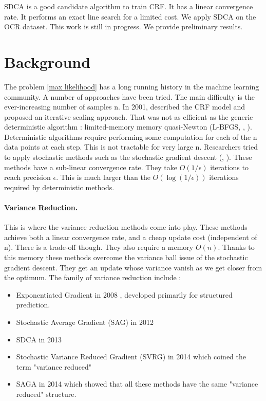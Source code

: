 \documentclass{article}
\DeclareMathOperator{\1}{\mathbb{1}}
\begin{document}
SDCA is a good candidate algorithm to train CRF.
It has a linear convergence rate.
It performs an exact line search for a limited cost.
We apply SDCA on the OCR dataset.
This work is still in progress.
We provide preliminary results.

\tableofcontents

\section{Background}
The problem \ref{max likelihood} has a long running history in the machine learning community.
A number of approaches have been tried.
The main difficulty is the ever-increasing number of samples n.
In 2001, \cite{lafferty_conditional_2001} described the CRF model and proposed an iterative scaling approach.
That was not as efficient as the generic deterministic algorithm : limited-memory memory quasi-Newton (L-BFGS, \cite{wallach_efficient_2002}, \cite{sha_shallow_2003}).
Deterministic algorithms require performing some computation for each of the n data points at each step.
This is not tractable for very large n.
Researchers tried to apply stochastic methods such as the stochastic gradient descent (\cite{vishwanathan_accelerated_2006}, \cite{finkel_efficient_2008}).
These methods have a sub-linear convergence rate.
They take $O(1/\epsilon)$ iterations to reach precision $\epsilon$.
This is much larger than the $O(\log(1/\epsilon))$ iterations required by deterministic methods.

\paragraph{Variance Reduction.}
This is where the variance reduction methods come into play.
These methods achieve both a linear convergence rate, and a cheap update cost (independent of n).
There is a trade-off though.
They also require a memory  $O(n)$.
Thanks to this memory these methods overcome the variance ball issue of the stochastic gradient descent.
They get an update whose variance vanish as we get closer from the optimum.
The family of variance reduction  include : 
\begin{itemize}
	\item	 Exponentiated Gradient in 2008 \cite{collins_exponentiated_2008}, developed primarily for structured prediction.
	\item Stochastic Average Gradient (SAG) in 2012 \cite{roux_stochastic_2012}
	\item SDCA in 2013
	\item Stochastic Variance Reduced Gradient (SVRG) in 2014 \cite{johnson_accelerating_2013} which coined the term "variance reduced"
	\item SAGA in 2014 \cite{defazio_saga:_2014} which showed that all these methods have the same "variance reduced" structure.  
\end{itemize}
\end{document}
